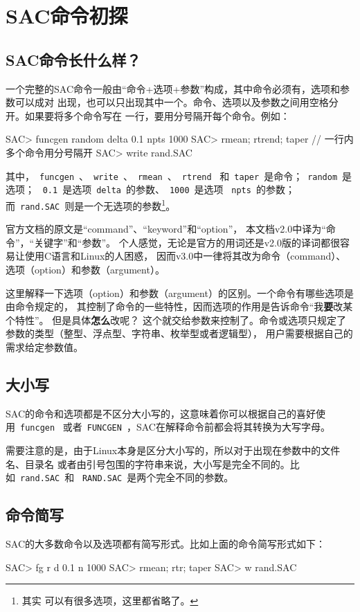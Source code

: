 \section{SAC命令初探}
\subsection{SAC命令长什么样？}
一个完整的SAC命令一般由``命令+选项+参数''构成，其中命令必须有，选项和参数可以成对
出现，也可以只出现其中一个。命令、选项以及参数之间用空格分开。如果要将多个命令写在
一行，要用分号隔开每个命令。例如：
\begin{SACCode}
SAC> funcgen random delta 0.1 npts 1000
SAC> rmean; rtrend; taper                 // 一行内多个命令用分号隔开
SAC> write rand.SAC
\end{SACCode}
其中，~\lstinline{funcgen}~、~\lstinline{write}~、~\lstinline{rmean}~、~\lstinline{rtrend}~
和~\lstinline{taper}~是命令；~\lstinline{random}~是选项；
~\lstinline{0.1}~是选项~\lstinline{delta}~的参数、~\lstinline{1000}~是选项
~\lstinline{npts}~的参数；而~\lstinline{rand.SAC}~则是一个无选项的参数\footnote{其实
可以有很多选项，这里都省略了。}。

\begin{Tips}
官方文档的原文是``command''、``keyword''和``option''，
本文档v2.0中译为``命令''，``关键字''和``参数''。
个人感觉，无论是官方的用词还是v2.0版的译词都很容易让使用C语言和Linux的人困惑，
因而v3.0中一律将其改为命令（command）、选项（option）和参数（argument）。

这里解释一下选项（option）和参数（argument）的区别。一个命令有哪些选项是由命令规定的，
其控制了命令的一些特性，因而选项的作用是告诉命令``我\textbf{要}改某个特性''。
但是具体\textbf{怎么}改呢？
这个就交给参数来控制了。命令或选项只规定了参数的类型（整型、浮点型、字符串、枚举型或者逻辑型），
用户需要根据自己的需求给定参数值。
\end{Tips}

\subsection{大小写}
SAC的命令和选项都是不区分大小写的，这意味着你可以根据自己的喜好使用~\lstinline{funcgen}~
或者~\lstinline{FUNCGEN}~，SAC在解释命令前都会将其转换为大写字母。

需要注意的是，由于Linux本身是区分大小写的，所以对于出现在参数中的文件名、目录名
或者由引号包围的字符串来说，大小写是完全不同的。比如~\lstinline{rand.SAC}~和
~\lstinline{RAND.SAC}~是两个完全不同的参数。

\subsection{命令简写}
SAC的大多数命令以及选项都有简写形式。比如上面的命令简写形式如下：
\begin{SACCode}
SAC> fg r d 0.1 n 1000
SAC> rmean; rtr; taper
SAC> w rand.SAC
\end{SACCode}

